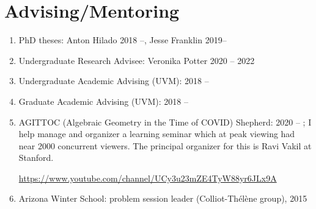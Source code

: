 \documentclass[a4paper,10pt]{article}
\begin{document}
\section*{Advising/Mentoring}
\begin{enumerate}
	\item PhD theses: Anton Hilado 2018 --, Jesse Franklin 2019--
	\item Undergraduate Research Advisee: Veronika Potter  2020 -- 2022
	\item Undergraduate Academic Advising (UVM): 2018 --
	\item Graduate Academic Advising (UVM): 2018 --
	\item AGITTOC (Algebraic Geometry in the Time of COVID) Shepherd: 2020 -- ; I help manage and organizer a learning seminar which at peak viewing had near 2000 concurrent viewers. The principal organizer for this is Ravi Vakil at Stanford.
	\begin{center}
			 \url{https://www.youtube.com/channel/UCy3u23mZE4TyW88yr6JLx9A}
	\end{center}
   \item  Arizona Winter School:  problem session leader (Colliot-Th\'{e}l\`ene group),  2015  

\end{enumerate}


\iffalse
\end{document}
